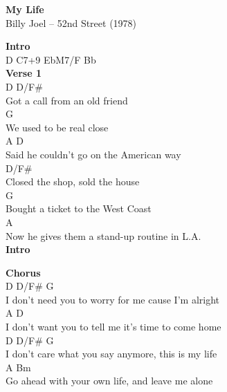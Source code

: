 \documentclass[a4paper]{article}
\begin{document}
    \begin{center}
        \textbf{My Life}
        ~\\
        Billy Joel -- 52nd Street (1978)
    \end{center}
    {
        \scriptsize
        \textbf{Intro}
        ~\\
        {
            \cutive
            \obeyspaces
D C7+9 EbM7/F Bb
\\

        }
        \textbf{Verse 1}
        ~\\
        {
            \cutive
            \obeyspaces
D                  D/F\#
\\
Got a call from an old friend
\\
                G
\\
We used to be real close
\\
A                                   D
\\
Said he couldn't go on the American way
\\
                           D/F\#
\\
Closed the shop, sold the house
\\
                        G
\\
Bought a ticket to the West Coast
\\
A
\\
Now he gives them a stand-up routine in L.A.
\\

        }
        \textbf{Intro}
        ~\\
        {
            \cutive
            \obeyspaces

        }
        \textbf{Chorus}
        ~\\
        {
            \cutive
            \obeyspaces
D                  D/F\#                    G
\\
I don't need you to worry for me cause I'm alright
\\
A                                                D
\\
   I don't want you to tell me it's time to come home
\\
D                  D/F\#                    G
\\
I don't care what you say anymore, this is my life
\\
A                                         Bm
\\
   Go ahead with your own life, and leave me alone
\\

}}
\end{document}
